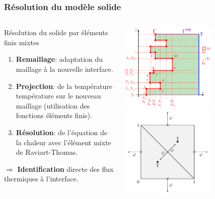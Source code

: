 \documentclass{beamer}
\begin{document}
\begin{frame}
    \frametitle{Résolution du modèle solide}
    \footnotesize


\begin{columns}[c]
	\begin{column}{0.6\textwidth}
	\begin{ceablock}{Résolution du solide par éléments finis mixtes}
\begin{enumerate}
			\item \textbf{Remaillage}: adaptation du maillage à la nouvelle interface.
			\item \textbf{Projection}: de la température température sur le nouveau maillage (utilisation des fonctions éléments finis).
			\item \textbf{Résolution}: de l'équation de la chaleur avec l'élément mixte de Raviart-Thomas.
		\end{enumerate}
\center $\Rightarrow$ \textbf{Identification} directe des flux thermiques à l'interface.
		\end{ceablock}
	\end{column}
	\begin{column}{0.5\textwidth}
	\center
		\includegraphics[width=0.65\textwidth]{Figures/crust_mesh.pdf}\\
		\includegraphics[width=0.65\textwidth]{Figures/elementFiniMixte2.pdf}

		
			\end{column}

	\end{columns}

\end{frame}
\end{document}
